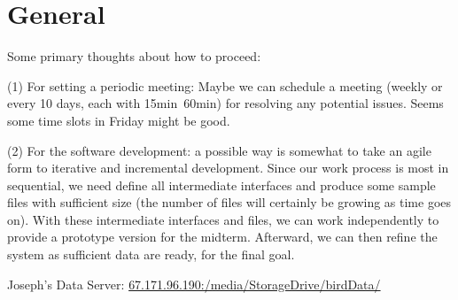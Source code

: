 \section{General}

Some primary thoughts about how to proceed:

(1) For setting a periodic meeting: Maybe we can schedule a meeting (weekly or every 10 days, each with 15min~60min) for resolving any potential issues. Seems some time slots in Friday might be good. 

(2) For the software development: a possible way is somewhat to take an agile form to iterative and incremental development. Since our work process is most in sequential, we need define all intermediate interfaces and produce some sample files with sufficient size (the number of files will certainly be growing as time goes on).  With these intermediate interfaces and files, we can work independently to provide a prototype version for the midterm. Afterward, we can then refine the system as sufficient data are ready, for the final goal.

Joseph's Data Server: \url{67.171.96.190:/media/StorageDrive/birdData/}